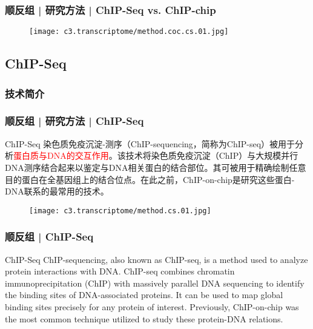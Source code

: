 \begin{frame}
  \frametitle{顺反组 | 研究方法 | ChIP-Seq vs. ChIP-chip}
  \begin{figure}
    \centering
    \texttt{[image: c3.transcriptome/method.coc.cs.01.jpg]}
  \end{figure}
\end{frame}

\subsection{ChIP-Seq}
\subsubsection{技术简介}

\begin{frame}
  \frametitle{顺反组 | 研究方法 | ChIP-Seq}
  {\footnotesize
  \begin{block}{ChIP-Seq}
    染色质免疫沉淀-测序（ChIP-sequencing，简称为ChIP-seq）被用于分析\textcolor{red}{蛋白质与DNA的交互作用}。该技术将染色质免疫沉淀（ChIP）与大规模并行DNA测序结合起来以鉴定与DNA相关蛋白的结合部位。其可被用于精确绘制任意目的蛋白在全基因组上的结合位点。在此之前，ChIP-on-chip是研究这些蛋白-DNA联系的最常用的技术。
  \end{block}
  }
  \begin{figure}
    \centering
    \texttt{[image: c3.transcriptome/method.cs.01.jpg]}
  \end{figure}
\end{frame}

\begin{frame}
  \frametitle{顺反组 | ChIP-Seq}
  \begin{block}{ChIP-Seq}
    ChIP-sequencing, also known as ChIP-seq, is a method used to analyze protein interactions with DNA. ChIP-seq combines chromatin immunoprecipitation (ChIP) with massively parallel DNA sequencing to identify the binding sites of DNA-associated proteins. It can be used to map global binding sites precisely for any protein of interest. Previously, ChIP-on-chip was the most common technique utilized to study these protein-DNA relations.
  \end{block}
\end{frame}

